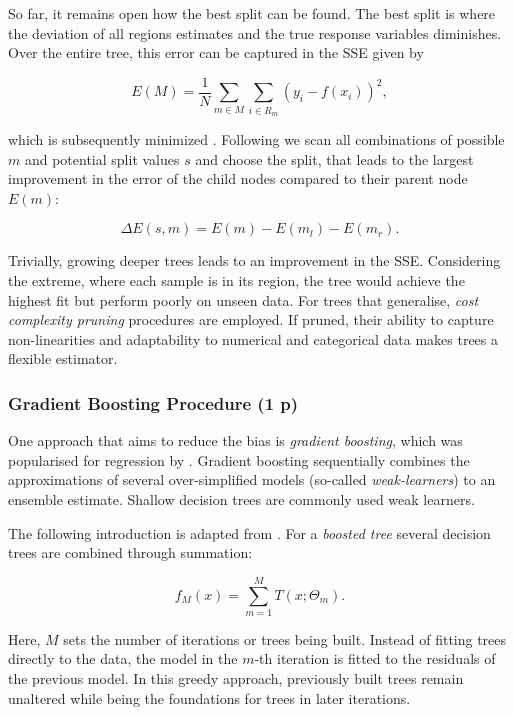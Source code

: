 So far, it remains open how the best split can be found. The best split is where the deviation of all regions estimates and the true response variables diminishes. Over the entire tree, this error can be captured in the \gls{SSE} given by

$$
  E(M)=\frac{1}{N} \sum_{m \in M} \sum_{i \in R_m}\left(y_{i}-f(x_i)\right)^{2},
$$

which is subsequently minimized \autocite{breimanClassificationRegressionTrees2017}. Following \textcite{breimanClassificationRegressionTrees2017} we scan all combinations of possible $m$ and potential split values $s$ and choose the split, that leads to the largest improvement in the error of the child nodes compared to their parent node $E(m)$:

$$
  \Delta E(s, m)=E(m)-E\left(m_{l}\right)-E\left(m_{r}\right).
$$


Trivially, growing deeper trees leads to an improvement in the \gls{SSE}. Considering the extreme, where each sample is in its region, the tree would achieve the highest fit but perform poorly on unseen data. For trees that generalise, \textit{cost complexity pruning} procedures are employed. If pruned, their ability to capture non-linearities and adaptability to numerical and categorical data makes trees a flexible estimator.


\subsubsection{Gradient Boosting
  Procedure (1 p)}\label{sec:gradient-boosting-procedure}

  One approach that aims to reduce the bias is \textit{gradient boosting}, which was popularised for regression by \textcite{friedmanGreedyFunctionApproximation2001}. Gradient boosting sequentially combines the approximations of several over-simplified models (so-called
  \textit{weak-learners}) to an ensemble estimate. Shallow decision trees are commonly used weak learners.
  
  The following introduction is adapted from \textcite{hastietrevorElementsStatisticalLearning2009}. For a \textit{boosted tree} several decision trees are combined through summation:
  
  $$
    f_{M}(x)=\sum_{m=1}^{M} T\left(x ; \Theta_{m}\right).
  $$
  
  Here, $M$ sets the number of iterations or trees being built. Instead of fitting trees directly to the data, the model in the $m$-th iteration is fitted to the residuals of the previous model. In this greedy approach, previously built trees remain unaltered while being the foundations for trees in later iterations.
  
